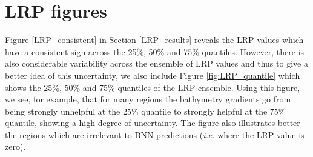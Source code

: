 \documentclass[a4paper]{article}
\begin{document}
\section{LRP figures}\label{appendix}
Figure \ref{LRP_consistent} in Section \ref{LRP_results} reveals the LRP values which have a consistent sign across the 25\%, 50\% and 75\% quantiles. However, there is also considerable variability across the ensemble of LRP values and thus to give a better idea of this uncertainty, we also include Figure \ref{fig:LRP_quantile} which shows the 25\%, 50\% and 75\% quantiles of the LRP ensemble. Using this figure, we see, for example, that for many regions the bathymetry gradients go from being strongly unhelpful at the 25\% quantile to strongly helpful at the 75\% quantile, showing a high degree of uncertainty. The figure also illustrates better the regions which are irrelevant to BNN predictions (\textit{i.e.} where the LRP value is zero).
\end{document}
